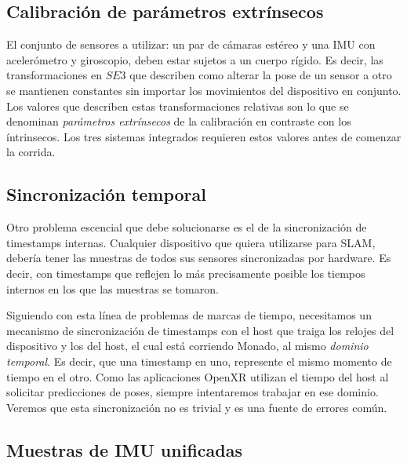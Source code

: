 \documentclass[ twoside,openright,titlepage,numbers=noenddot,%
                headinclude,footinclude,cleardoublepage=empty,abstract=on,
                BCOR=-5mm,paper=a4,fontsize=11pt
                ]{scrreprt}
\begin{document}
\hypertarget{calibraciuxf3n-de-paruxe1metros-extruxednsecos}{%
\subsection{Calibración de parámetros
extrínsecos}\label{calibraciuxf3n-de-paruxe1metros-extruxednsecos}}

El conjunto de sensores a utilizar: un par de cámaras estéreo y una IMU
con acelerómetro y giroscopio, deben estar sujetos a un cuerpo rígido.
Es decir, las transformaciones en \(SE3\) que describen como alterar la
pose de un sensor a otro se mantienen constantes sin importar los
movimientos del dispositivo en conjunto. Los valores que describen estas
transformaciones relativas son lo que se denominan \emph{parámetros
extrínsecos} de la calibración en contraste con los íntrinsecos. Los
tres sistemas integrados requieren estos valores antes de comenzar la
corrida.

\hypertarget{sincronizaciuxf3n-temporal}{%
\subsection{Sincronización temporal}\label{sincronizaciuxf3n-temporal}}

Otro problema escencial que debe solucionarse es el de la sincronización
de timestamps internas. Cualquier dispositivo que quiera utilizarse para
SLAM, debería tener las muestras de todos sus sensores sincronizadas por
hardware. Es decir, con timestamps que reflejen lo más precisamente
posible los tiempos internos en los que las muestras se tomaron.

Siguiendo con esta línea de problemas de marcas de tiempo, necesitamos
un mecanismo de sincronización de timestamps con el host que traiga los
relojes del dispositivo y los del host, el cual está corriendo Monado,
al mismo \emph{dominio temporal}. Es decir, que una timestamp en uno,
represente el mismo momento de tiempo en el otro. Como las aplicaciones
OpenXR utilizan el tiempo del host al solicitar predicciones de poses,
siempre intentaremos trabajar en ese dominio. Veremos que esta
sincronización no es trivial y es una fuente de errores común.

\hypertarget{muestras-de-imu-unificadas}{%
\subsection{Muestras de IMU
unificadas}\label{muestras-de-imu-unificadas}}
\end{document}
